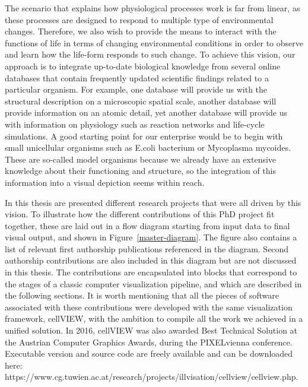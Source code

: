 The scenario that explains how physiological processes work is far from linear, as these processes are designed to respond to multiple type of environmental changes.
Therefore, we also wish to provide the means to interact with the functions of life in terms of changing environmental conditions in order to observe and learn how the life-form responds to such change. 
To achieve this vision, our approach is to integrate up-to-date biological knowledge from several online databases that contain frequently updated scientific findings related to a particular organism. 
For example, one database will provide us with the structural description on a microscopic spatial scale, another database will provide information on an atomic detail, yet another database will provide us with information on physiology such as reaction networks and life-cycle simulations.
A good starting point for our enterprise would be to begin with small unicellular organisms such as E.coli bacterium or Mycoplasma mycoides.
These are so-called model organisms because we already have an extensive knowledge about their functioning and structure, so the integration of this information into a visual depiction seems within reach. 

In this thesis are presented different research projects that were all driven by this vision.
To illustrate how the different contributions of this PhD project fit together, these are laid out in a flow diagram starting from input data to final visual output, and shown in Figure~\ref{master-diagram}.
The figure also contains a list of relevant first authorship publications referenced in the diagram.
Second authorship contributions are also included in this diagram but are not discussed in this thesis.
The contributions are encapsulated into blocks that correspond to the stages of a classic computer visualization pipeline, and which are described in the following sections.
It is worth mentioning that all the pieces of software associated with these contributions were developed with the same visualization framework, cellVIEW, with the ambition to compile all the work we achieved in a unified solution.
In 2016, cellVIEW was also awarded Best Technical Solution at the Austrian Computer Graphics Awards, during the PIXELvienna conference.
Executable version and source code are freely available and can be downloaded here: https://www.cg.tuwien.ac.at/research/projects/illvisation/cellview/cellview.php.


